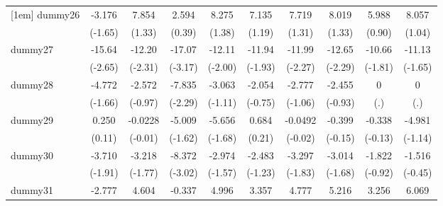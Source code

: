 {\begin{tabular}{l*{9}{c}}
[1em]
dummy26     &      -3.176         &       7.854         &       2.594         &       8.275         &       7.135         &       7.719         &       8.019         &       5.988         &       8.057         \\
            &     (-1.65)         &      (1.33)         &      (0.39)         &      (1.38)         &      (1.19)         &      (1.31)         &      (1.33)         &      (0.90)         &      (1.04)         \\
[1em]
dummy27     &      -15.64\sym{**} &      -12.20\sym{*}  &      -17.07\sym{**} &      -12.11\sym{*}  &      -11.94         &      -11.99\sym{*}  &      -12.65\sym{*}  &      -10.66         &      -11.13         \\
            &     (-2.65)         &     (-2.31)         &     (-3.17)         &     (-2.00)         &     (-1.93)         &     (-2.27)         &     (-2.29)         &     (-1.81)         &     (-1.65)         \\
[1em]
dummy28     &      -4.772         &      -2.572         &      -7.835\sym{*}  &      -3.063         &      -2.054         &      -2.777         &      -2.455         &           0         &           0         \\
            &     (-1.66)         &     (-0.97)         &     (-2.29)         &     (-1.11)         &     (-0.75)         &     (-1.06)         &     (-0.93)         &         (.)         &         (.)         \\
[1em]
dummy29     &       0.250         &     -0.0228         &      -5.009         &      -5.656         &       0.684         &     -0.0492         &      -0.399         &      -0.338         &      -4.981         \\
            &      (0.11)         &     (-0.01)         &     (-1.62)         &     (-1.68)         &      (0.21)         &     (-0.02)         &     (-0.15)         &     (-0.13)         &     (-1.14)         \\
[1em]
dummy30     &      -3.710         &      -3.218         &      -8.372\sym{**} &      -2.974         &      -2.483         &      -3.297         &      -3.014         &      -1.822         &      -1.516         \\
            &     (-1.91)         &     (-1.77)         &     (-3.02)         &     (-1.57)         &     (-1.23)         &     (-1.83)         &     (-1.68)         &     (-0.92)         &     (-0.45)         \\
[1em]
dummy31     &      -2.777         &       4.604         &      -0.337         &       4.996         &       3.357         &       4.777         &       5.216         &       3.256         &       6.069         \\

\end{tabular}}
